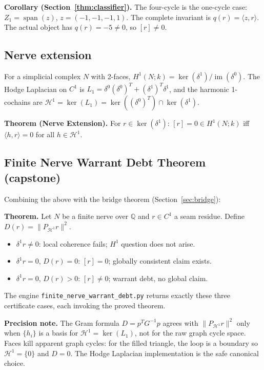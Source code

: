 \documentclass[11pt]{article}
\begin{document}
\textbf{Corollary (Section~\ref{thm:classifier}).}
The four-cycle is the one-cycle case: $Z_1=\operatorname{span}(z)$, $z=(-1,-1,-1,1)$.
The complete invariant is $q(r)=\langle z,r\rangle$. The actual object has
$q(r)=-5\neq0$, so $[r]\neq0$.

\subsection*{Nerve extension}

For a simplicial complex $N$ with 2-faces, $H^1(N;k)=\ker(\delta^1)/\operatorname{im}(\delta^0)$.
The Hodge Laplacian on $C^1$ is $L_1=\delta^0(\delta^0)^T+(\delta^1)^T\delta^1$,
and the harmonic 1-cochains are $\mathcal{H}^1=\ker(L_1)=\ker((\delta^0)^T)\cap\ker(\delta^1)$.

\textbf{Theorem (Nerve Extension).}
For $r\in\ker(\delta^1)$:
$[r]=0\in H^1(N;k)$ iff $\langle h,r\rangle=0$ for all $h\in\mathcal{H}^1$.

\subsection*{Finite Nerve Warrant Debt Theorem (capstone)}

Combining the above with the bridge theorem (Section~\ref{sec:bridge}):

\textbf{Theorem.}
Let $N$ be a finite nerve over $\mathbb{Q}$ and $r\in C^1$ a seam residue.
Define $D(r)=\|P_{\mathcal{H}^1}r\|^2$.
\begin{itemize}
\item $\delta^1 r\neq0$: local coherence fails; $H^1$ question does not arise.
\item $\delta^1 r=0$, $D(r)=0$: $[r]=0$; globally consistent claim exists.
\item $\delta^1 r=0$, $D(r)>0$: $[r]\neq0$; warrant debt, no global claim.
\end{itemize}

The engine \texttt{finite\_nerve\_warrant\_debt.py} returns exactly these three
certificate cases, each invoking the proved theorem.

\textbf{Precision note.}
The Gram formula $D=p^TG^{-1}p$ agrees with $\|P_{\mathcal{H}^1}r\|^2$ only
when $\{h_i\}$ is a basis for $\mathcal{H}^1=\ker(L_1)$, not for the raw graph
cycle space. Faces kill apparent graph cycles: for the filled triangle, the
loop is a boundary so $\mathcal{H}^1=\{0\}$ and $D=0$. The Hodge Laplacian
implementation is the safe canonical choice.
\end{document}
